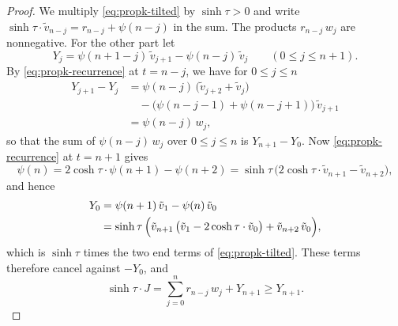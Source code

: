 \documentclass{amsart}
\theoremstyle{definition}
\theoremstyle{remark}
\numberwithin{equation}{section}
\begin{document}
\begin{proof}
We multiply \eqref{eq:propk-tilted} by $\sinh\tau>0$ and write
$\sinh\tau\cdot\tilde v_{n-j}=r_{n-j}+\psi(n-j)$ in the sum. The products
$r_{n-j}\,w_j$ are nonnegative. For the other part let
\[
Y_j=\psi(n+1-j)\,\tilde v_{j+1}-\psi(n-j)\,\tilde v_j
\qquad(0\le j\le n+1).
\]
By \eqref{eq:propk-recurrence} at $t=n-j$, we have for $0\le j\le n$
\begin{align*}
Y_{j+1}-Y_j&=\psi(n-j)\,\bigl(\tilde v_{j+2}+\tilde v_j\bigr)\\
&\quad-\bigl(\psi(n-j-1)+\psi(n-j+1)\bigr)\,\tilde v_{j+1}\\
&=\psi(n-j)\,w_j ,
\end{align*}
so that the sum of $\psi(n-j)\,w_j$ over $0\le j\le n$ is
$Y_{n+1}-Y_0$. Now \eqref{eq:propk-recurrence} at $t=n+1$ gives
\[
\psi(n)=2\cosh\tau\cdot\psi(n+1)-\psi(n+2)
=\sinh\tau\,\bigl(2\cosh\tau\cdot\tilde v_{n+1}-\tilde v_{n+2}\bigr),
\]
and hence
\begin{align*}
Y_0&=\psi(n+1)\,\tilde v_1-\psi(n)\,\tilde v_0\\
&=\sinh\tau\,\Bigl(\tilde v_{n+1}\,
\bigl(\tilde v_1-2\cosh\tau\cdot\tilde v_0\bigr)
+\tilde v_{n+2}\,\tilde v_0\Bigr),
\end{align*}
which is $\sinh\tau$ times the two end terms of
\eqref{eq:propk-tilted}. These terms therefore cancel against $-Y_0$, and
\[
\sinh\tau\cdot J=\sum_{j=0}^{n}r_{n-j}\,w_j+Y_{n+1}\ge Y_{n+1} .
\]


\end{proof}
\end{document}
